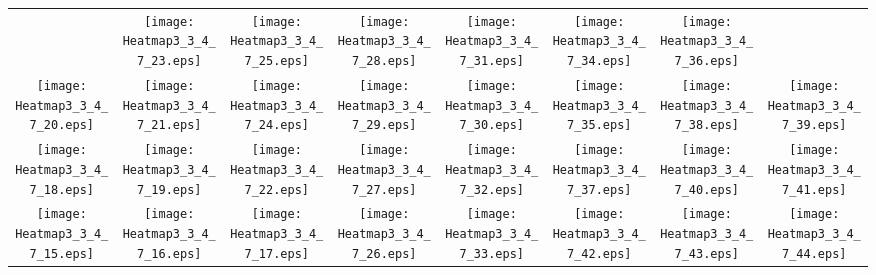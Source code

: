 \documentclass{standalone}
\begin{document}
\renewcommand{\arraystretch}{0}
\setlength{\tabcolsep}{0pt}
\begin{tabular}{ *8{c} }
 & \texttt{[image: Heatmap3\_3\_4\_7\_23.eps]} & \texttt{[image: Heatmap3\_3\_4\_7\_25.eps]} & \texttt{[image: Heatmap3\_3\_4\_7\_28.eps]} & \texttt{[image: Heatmap3\_3\_4\_7\_31.eps]} & \texttt{[image: Heatmap3\_3\_4\_7\_34.eps]} & \texttt{[image: Heatmap3\_3\_4\_7\_36.eps]} &  \\
\texttt{[image: Heatmap3\_3\_4\_7\_20.eps]} & \texttt{[image: Heatmap3\_3\_4\_7\_21.eps]} & \texttt{[image: Heatmap3\_3\_4\_7\_24.eps]} & \texttt{[image: Heatmap3\_3\_4\_7\_29.eps]} & \texttt{[image: Heatmap3\_3\_4\_7\_30.eps]} & \texttt{[image: Heatmap3\_3\_4\_7\_35.eps]} & \texttt{[image: Heatmap3\_3\_4\_7\_38.eps]} & \texttt{[image: Heatmap3\_3\_4\_7\_39.eps]} \\
\texttt{[image: Heatmap3\_3\_4\_7\_18.eps]} & \texttt{[image: Heatmap3\_3\_4\_7\_19.eps]} & \texttt{[image: Heatmap3\_3\_4\_7\_22.eps]} & \texttt{[image: Heatmap3\_3\_4\_7\_27.eps]} & \texttt{[image: Heatmap3\_3\_4\_7\_32.eps]} & \texttt{[image: Heatmap3\_3\_4\_7\_37.eps]} & \texttt{[image: Heatmap3\_3\_4\_7\_40.eps]} & \texttt{[image: Heatmap3\_3\_4\_7\_41.eps]} \\
\texttt{[image: Heatmap3\_3\_4\_7\_15.eps]} & \texttt{[image: Heatmap3\_3\_4\_7\_16.eps]} & \texttt{[image: Heatmap3\_3\_4\_7\_17.eps]} & \texttt{[image: Heatmap3\_3\_4\_7\_26.eps]} & \texttt{[image: Heatmap3\_3\_4\_7\_33.eps]} & \texttt{[image: Heatmap3\_3\_4\_7\_42.eps]} & \texttt{[image: Heatmap3\_3\_4\_7\_43.eps]} & \texttt{[image: Heatmap3\_3\_4\_7\_44.eps]} \\

\end{tabular}
\end{document}
